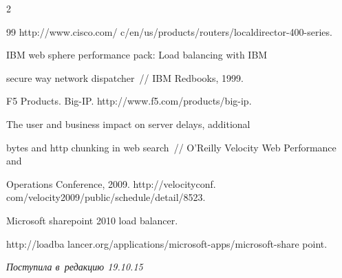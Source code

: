 \begin{multicols}{2}
{{\begin{thebibliography}{99}
{    http://www.cisco.com/ c/en/us/products/routers/localdirector-400-series}.




     IBM web sphere performance pack: Load balancing with IBM 


secure way network dispatcher~// IBM Redbooks, 1999.




    F5 Products. Big-IP. {\sf http://www.f5.com/products/big-ip}.


    




     The user and business impact on server delays, additional 


bytes and http chunking in web search~// O'Reilly Velocity Web Performance and 


Operations Conference, 2009. {\sf http://velocityconf. com/velocity2009/public/schedule/detail/8523}.




    Microsoft sharepoint 2010 load balancer. 


    {\sf http://loadba lancer.org/applications/microsoft-apps/microsoft-share point}. 


 \end{thebibliography}





 }


 }





\end{multicols}





\vspace*{-3pt}





\hfill{\small\textit{Поступила в~редакцию 19.10.15}}










\newpage





